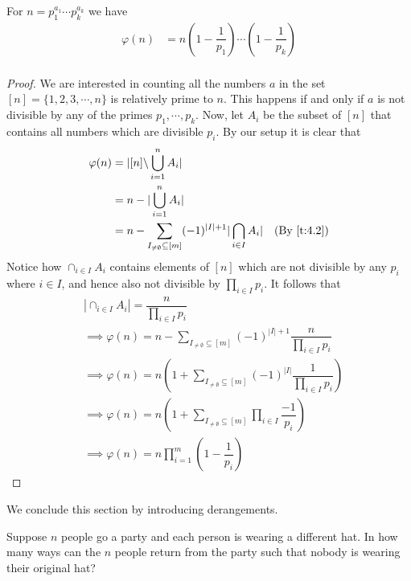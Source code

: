 \begin{theorem}
For $n=p_1^{a_1}\cdots p_k^{a_k}$ we have 
\begin{align*}
\varphi(n) &= n\left(1-\dfrac{1}{p_1}\right)\cdots\left(1-\dfrac{1}{p_k}\right) \\
\end{align*}
\end{theorem}
\begin{proof}
We are interested in counting all the numbers $a$ in the set $[n]=\{1,2,3,\cdots,n\}$ is relatively prime to $n$. This happens if and only if $a$ is not divisible by any of the primes $p_1,\cdots,p_k$. Now, let $A_i$ be the subset of $[n]$ that contains all numbers which are divisible $p_i$. By our setup it is clear that 
\begin{align*}
\varphi(n) &= |[n]\backslash \bigcup_{i=1}^{n}A_i| \\
&= n - |\bigcup_{i=1}^{n}A_i| \\
&= n - \sum_{I_{\neq \emptyset}\subseteq [m]}(-1)^{|I|+1}|\bigcap_{i\in I}A_i| \quad \text{(By \cref{t:4.2})}
\end{align*}
Notice how $\cap_{i\in I}A_i$ contains elements of $[n]$ which are not divisible by any $p_i$ where $i\in I$, and hence also not divisible by $\prod_{i\in I}p_i$. It follows that
\begin{align*}
&|\cap_{i\in I}A_i| = \dfrac{n}{\prod_{i\in I}p_i} \\
&\implies \varphi(n) = n - \sum_{I_{\neq \emptyset}\subseteq [m]}(-1)^{|I|+1}\dfrac{n}{\prod_{i\in I}p_i} \\
&\implies \varphi(n) = n\left(1+\sum_{I_{\neq\emptyset}\subseteq [m]}(-1)^{|I|}\dfrac{1}{\prod_{i\in I}p_i}\right) \\
&\implies \varphi(n) = n\left(1+\sum_{I_{\neq\emptyset}\subseteq [m]}\prod_{i\in I}\dfrac{-1}{p_i}\right) \\
&\implies \varphi(n) = n\prod_{i=1}^{m}\left(1-\dfrac{1}{p_i}\right)
\end{align*}

\end{proof}
We conclude this section by introducing derangements. 
\begin{question}
Suppose $n$ people go a party and each person is wearing a different hat. In how many ways can the $n$ people return from the party such that nobody is wearing their original hat?    
\end{question}

